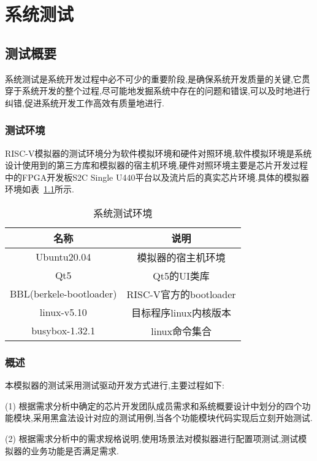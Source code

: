 
\chapter{系统测试}

\section{测试概要}
系统测试是系统开发过程中必不可少的重要阶段,是确保系统开发质量的关键,它贯穿于系统开发的整个过程,尽可能地发掘系统中存在的问题和错误,可以及时地进行纠错,促进系统开发工作高效有质量地进行.

\subsection{测试环境}
RISC-V模拟器的测试环境分为软件模拟环境和硬件对照环境,软件模拟环境是系统设计使用到的第三方库和模拟器的宿主机环境,硬件对照环境主要是芯片开发过程中的FPGA开发板S2C Single U440平台以及流片后的真实芯片环境.具体的模拟器环境如表~\ref{tab:env}所示.
\begin{table}[h]
    \centering
    \caption{系统测试环境}
    \label{tab:env}
    \begin{tabular}{cc}
      \toprule
      名称	& 说明\\
      \midrule
    Ubuntu20.04	& \multicolumn{1}{c}{模拟器的宿主机环境}\\
    Qt5	& \multicolumn{1}{c}{Qt5的UI类库}\\
    BBL(berkele-bootloader)	& \multicolumn{1}{c}{RISC-V官方的bootloader}\\
    linux-v5.10    & \multicolumn{1}{c}{目标程序linux内核版本}\\
    busybox-1.32.1 & \multicolumn{1}{c}{linux命令集合}\\
      \bottomrule
    \end{tabular}
\end{table}


\subsection{概述}
本模拟器的测试采用测试驱动开发方式进行,主要过程如下:


(1) 根据需求分析中确定的芯片开发团队成员需求和系统概要设计中划分的四个功能模块,采用黑盒法设计对应的测试用例,当各个功能模块代码实现后立刻开始测试.


(2) 根据需求分析中的需求规格说明,使用场景法对模拟器进行配置项测试,测试模拟器的业务功能是否满足需求.


